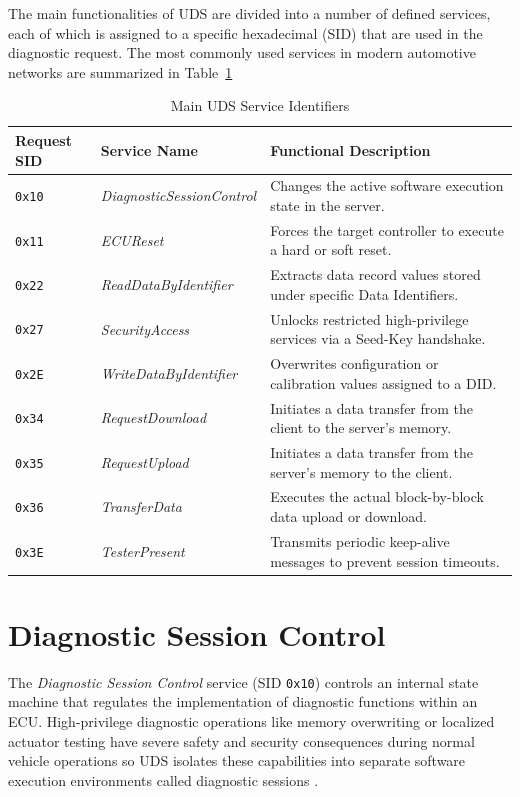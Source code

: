 The main functionalities of \gls{UDS} are divided into a number of defined services, each of which is assigned to a specific hexadecimal (\gls{SID}) that are used in the diagnostic request. The most commonly used services in modern automotive networks are summarized in Table~\ref{tab:uds_main_services}
\begin{table}[htbp]
    \centering
    \small
    \renewcommand{\arraystretch}{1.3} %
    \begin{tabularx}{\textwidth}{|l|l|X|}
        \hline
        \textbf{Request SID} & \textbf{Service Name} & \textbf{Functional Description} \\ \hline
        \texttt{0\textnormal{x}10} & \textit{DiagnosticSessionControl} & Changes the active software execution state in the server. \\
        \texttt{0\textnormal{x}11} & \textit{ECUReset} & Forces the target controller to execute a hard or soft reset. \\
        \texttt{0\textnormal{x}22} & \textit{ReadDataByIdentifier} & Extracts data record values stored under specific Data Identifiers. \\
        \texttt{0\textnormal{x}27} & \textit{SecurityAccess} & Unlocks restricted high-privilege services via a Seed-Key handshake. \\
        \texttt{0\textnormal{x}2E} & \textit{WriteDataByIdentifier} & Overwrites configuration or calibration values assigned to a DID. \\
        \texttt{0\textnormal{x}34} & \textit{RequestDownload} & Initiates a data transfer from the client to the server's memory. \\
        \texttt{0\textnormal{x}35} & \textit{RequestUpload} & Initiates a data transfer from the server's memory to the client. \\
        \texttt{0\textnormal{x}36} & \textit{TransferData} & Executes the actual block-by-block data upload or download. \\
        \texttt{0\textnormal{x}3E} & \textit{TesterPresent} & Transmits periodic keep-alive messages to prevent session timeouts. \\ \hline
    \end{tabularx}
\caption[Main UDS Service Identifiers.]{Main UDS Service Identifiers}
\label{tab:uds_main_services}
\end{table}

\section{Diagnostic Session Control}\label{sec:diagnostic_session_control}
The \textit{Diagnostic Session Control} service (\gls{SID} \texttt{0\textnormal{x}10}) controls an internal state machine that regulates the implementation of diagnostic functions within an \gls{ECU}. High-privilege diagnostic operations like memory overwriting or localized actuator testing have severe safety and security consequences during normal vehicle operations so \gls{UDS} isolates these capabilities into separate software execution environments called diagnostic sessions \cite{DiagnosticSessionControl}. 


